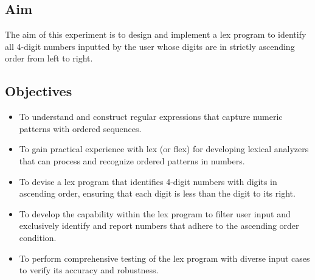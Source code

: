 \documentclass[12pt]{article}
\begin{document}
\subsection*{Aim}
The aim of this experiment is to design and implement a lex program to identify all 4-digit numbers inputted by the user whose digits are in strictly ascending order from left to right.

\subsection*{Objectives}
\begin{itemize}
    \item To understand and construct regular expressions that capture numeric patterns with ordered sequences.
    \item To gain practical experience with lex (or flex) for developing lexical analyzers that can process and recognize ordered patterns in numbers.
    \item To devise a lex program that identifies 4-digit numbers with digits in ascending order, ensuring that each digit is less than the digit to its right.
    \item To develop the capability within the lex program to filter user input and exclusively identify and report numbers that adhere to the ascending order condition.
    \item To perform comprehensive testing of the lex program with diverse input cases to verify its accuracy and robustness.
\end{itemize}
\end{document}
